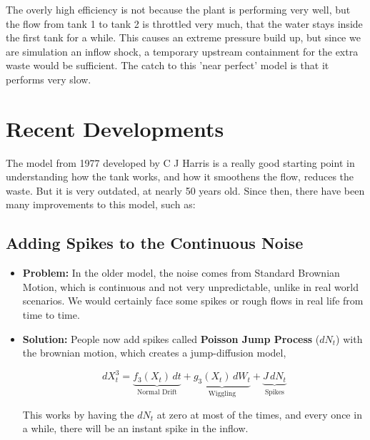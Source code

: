 \documentclass[conference]{IEEEtran}
\renewcommand{\bigskip}{\vspace{2\baselineskip}}
\renewcommand{\smallskip}{\vspace{0.5\baselineskip}}
\theoremstyle{definitionsc}
\theoremstyle{plainsc}
\theoremstyle{remarksc}
\begin{document}
\smallskip


The overly high efficiency is not because the plant is performing very well, but the flow from tank 1 to tank 2 is throttled very much, that the water stays inside the first tank for a while. This causes an extreme pressure build up, but since we are simulation an inflow shock, a temporary upstream containment for the extra waste would be sufficient. The catch to this 'near perfect' model is that it performs very slow.



















\bigskip


\section{Recent Developments}



The model from 1977 developed by C J Harris is a really good starting point in understanding how the tank works, and how it smoothens the flow, reduces the waste. But it is very outdated, at nearly 50 years old. Since then, there have been many improvements to this model, such as:


\smallskip



\subsection{\textbf{Adding Spikes to the Continuous Noise}}


\begin{itemize}
	\item \textbf{Problem:} In the older model, the noise comes from Standard Brownian Motion, which is continuous and not very unpredictable, unlike in real world scenarios. We would certainly face some spikes or rough flows in real life from time to time.
	\item \textbf{Solution:} People now add spikes called \textbf{Poisson Jump Process} ($dN_t$) with the brownian motion, which creates a jump-diffusion model,

\begin{equation*}
	dX_t^3 = \underbrace{f_3(X_t)\,dt}_{\text{Normal Drift}} + \underbrace{g_3(X_t)\,dW_t}_{\text{Wiggling}} + \underbrace{J\,dN_t}_{\text{Spikes}}
\end{equation*}



\smallskip


This works by having the $dN_t$ at zero at most of the times, and every once in a while, there will be an instant spike in the inflow. \cite{applebaum}

\end{itemize}
\end{document}
